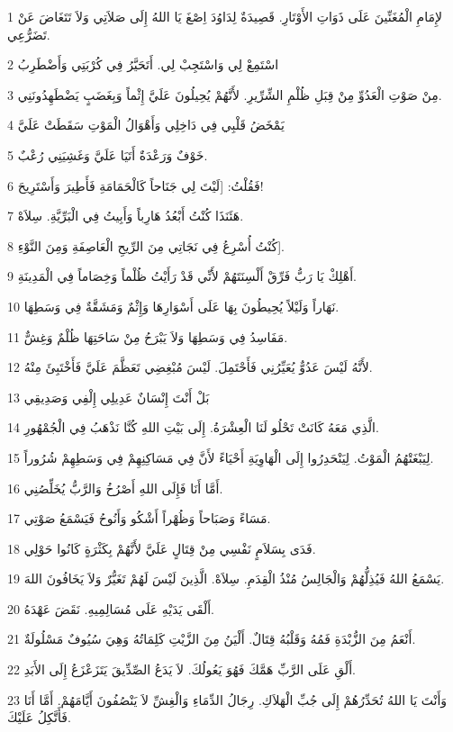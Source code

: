 \par 1 لإِمَامِ الْمُغَنِّينَ عَلَى ذَوَاتِ الأَوْتَارِ. قَصِيدَةٌ لِدَاوُدَ اِصْغَ يَا اللهُ إِلَى صَلاَتِي وَلاَ تَتَغَاضَ عَنْ تَضَرُّعِي.
\par 2 اسْتَمِعْ لِي وَاسْتَجِبْ لِي. أَتَحَيَّرُ فِي كُرْبَتِي وَأَضْطَرِبُ
\par 3 مِنْ صَوْتِ الْعَدُوِّ مِنْ قِبَلِ ظُلْمِ الشِّرِّيرِ. لأَنَّهُمْ يُحِيلُونَ عَلَيَّ إِثْماً وَبِغَضَبٍ يَضْطَهِدُونَنِي.
\par 4 يَمْخَضُ قَلْبِي فِي دَاخِلِي وَأَهْوَالُ الْمَوْتِ سَقَطَتْ عَلَيَّ
\par 5 خَوْفٌ وَرَعْدَةٌ أَتَيَا عَلَيَّ وَغَشِيَنِي رُعْبٌ.
\par 6 فَقُلْتُ: [لَيْتَ لِي جَنَاحاً كَالْحَمَامَةِ فَأَطِيرَ وَأَسْتَرِيحَ!
\par 7 هَئَنَذَا كُنْتُ أَبْعُدُ هَارِباً وَأَبِيتُ فِي الْبَرِّيَّةِ. سِلاَهْ.
\par 8 كُنْتُ أُسْرِعُ فِي نَجَاتِي مِنَ الرِّيحِ الْعَاصِفَةِ وَمِنَ النَّوْءِ].
\par 9 أَهْلِكْ يَا رَبُّ فَرِّقْ أَلْسِنَتَهُمْ لأَنِّي قَدْ رَأَيْتُ ظُلْماً وَخِصَاماً فِي الْمَدِينَةِ.
\par 10 نَهَاراً وَلَيْلاً يُحِيطُونَ بِهَا عَلَى أَسْوَارِهَا وَإِثْمٌ وَمَشَقَّةٌ فِي وَسَطِهَا.
\par 11 مَفَاسِدُ فِي وَسَطِهَا وَلاَ يَبْرَحُ مِنْ سَاحَتِهَا ظُلْمٌ وَغِشٌّ.
\par 12 لأَنَّهُ لَيْسَ عَدُوٌّ يُعَيِّرُنِي فَأَحْتَمِلَ. لَيْسَ مُبْغِضِي تَعَظَّمَ عَلَيَّ فَأَخْتَبِئَ مِنْهُ.
\par 13 بَلْ أَنْتَ إِنْسَانٌ عَدِيلِي إِلْفِي وَصَدِيقِي
\par 14 الَّذِي مَعَهُ كَانَتْ تَحْلُو لَنَا الْعِشْرَةُ. إِلَى بَيْتِ اللهِ كُنَّا نَذْهَبُ فِي الْجُمْهُورِ.
\par 15 لِيَبْغَتْهُمُ الْمَوْتُ. لِيَنْحَدِرُوا إِلَى الْهَاوِيَةِ أَحْيَاءً لأَنَّ فِي مَسَاكِنِهِمْ فِي وَسَطِهِمْ شُرُوراً.
\par 16 أَمَّا أَنَا فَإِلَى اللهِ أَصْرُخُ وَالرَّبُّ يُخَلِّصُنِي.
\par 17 مَسَاءً وَصَبَاحاً وَظُهْراً أَشْكُو وَأَنُوحُ فَيَسْمَعُ صَوْتِي.
\par 18 فَدَى بِسَلاَمٍ نَفْسِي مِنْ قِتَالٍ عَلَيَّ لأَنَّهُمْ بِكَثْرَةٍ كَانُوا حَوْلِي.
\par 19 يَسْمَعُ اللهُ فَيُذِلُّهُمْ وَالْجَالِسُ مُنْذُ الْقِدَمِ. سِلاَهْ. الَّذِينَ لَيْسَ لَهُمْ تَغَيُّرٌ وَلاَ يَخَافُونَ اللهَ.
\par 20 أَلْقَى يَدَيْهِ عَلَى مُسَالِمِيهِ. نَقَضَ عَهْدَهُ.
\par 21 أَنْعَمُ مِنَ الزُّبْدَةِ فَمُهُ وَقَلْبُهُ قِتَالٌ. أَلْيَنُ مِنَ الزَّيْتِ كَلِمَاتُهُ وَهِيَ سُيُوفٌ مَسْلُولَةٌ.
\par 22 أَلْقِ عَلَى الرَّبِّ هَمَّكَ فَهُوَ يَعُولُكَ. لاَ يَدَعُ الصِّدِّيقَ يَتَزَعْزَعُ إِلَى الأَبَدِ.
\par 23 وَأَنْتَ يَا اللهُ تُحَدِّرُهُمْ إِلَى جُبِّ الْهَلاَكِ. رِجَالُ الدِّمَاءِ وَالْغِشِّ لاَ يَنْصُفُونَ أَيَّامَهُمْ. أَمَّا أَنَا فَأَتَّكِلُ عَلَيْكَ.

